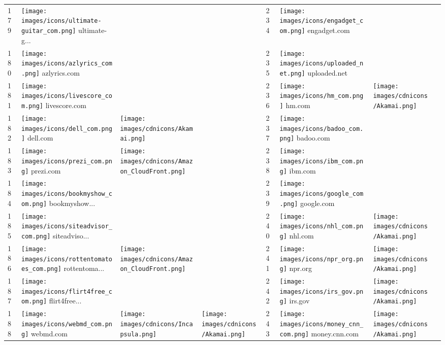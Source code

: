 \begin{table}[]
\begin{tabular}{|llll|llll|}
179 & \texttt{[image: images/icons/ultimate-guitar\_com.png]} ultimate-g... & & & 234 & \texttt{[image: images/icons/engadget\_com.png]} engadget.com & & \\
180 & \texttt{[image: images/icons/azlyrics\_com.png]} azlyrics.com & & & 235 & \texttt{[image: images/icons/uploaded\_net.png]} uploaded.net & & \\
181 & \texttt{[image: images/icons/livescore\_com.png]} livescore.com & & & 236 & \texttt{[image: images/icons/hm\_com.png]} hm.com & \texttt{[image: images/cdnicons/Akamai.png]} & \\
182 & \texttt{[image: images/icons/dell\_com.png]} dell.com & \texttt{[image: images/cdnicons/Akamai.png]} & & 237 & \texttt{[image: images/icons/badoo\_com.png]} badoo.com & & \\
183 & \texttt{[image: images/icons/prezi\_com.png]} prezi.com & \texttt{[image: images/cdnicons/Amazon\_CloudFront.png]} & & 238 & \texttt{[image: images/icons/ibm\_com.png]} ibm.com & & \\
184 & \texttt{[image: images/icons/bookmyshow\_com.png]} bookmyshow... & & & 239 & \texttt{[image: images/icons/google\_com.png]} google.com & & \\
185 & \texttt{[image: images/icons/siteadvisor\_com.png]} siteadviso... & & & 240 & \texttt{[image: images/icons/nhl\_com.png]} nhl.com & \texttt{[image: images/cdnicons/Akamai.png]} & \\
186 & \texttt{[image: images/icons/rottentomatoes\_com.png]} rottentoma... & \texttt{[image: images/cdnicons/Amazon\_CloudFront.png]} & & 241 & \texttt{[image: images/icons/npr\_org.png]} npr.org & \texttt{[image: images/cdnicons/Akamai.png]} & \\
187 & \texttt{[image: images/icons/flirt4free\_com.png]} flirt4free... & & & 242 & \texttt{[image: images/icons/irs\_gov.png]} irs.gov & \texttt{[image: images/cdnicons/Akamai.png]} & \\
188 & \texttt{[image: images/icons/webmd\_com.png]} webmd.com & \texttt{[image: images/cdnicons/Incapsula.png]} & \texttt{[image: images/cdnicons/Akamai.png]} & 243 & \texttt{[image: images/icons/money\_cnn\_com.png]} money.cnn.com & \texttt{[image: images/cdnicons/Akamai.png]} & \\

\end{tabular}
\end{table}
